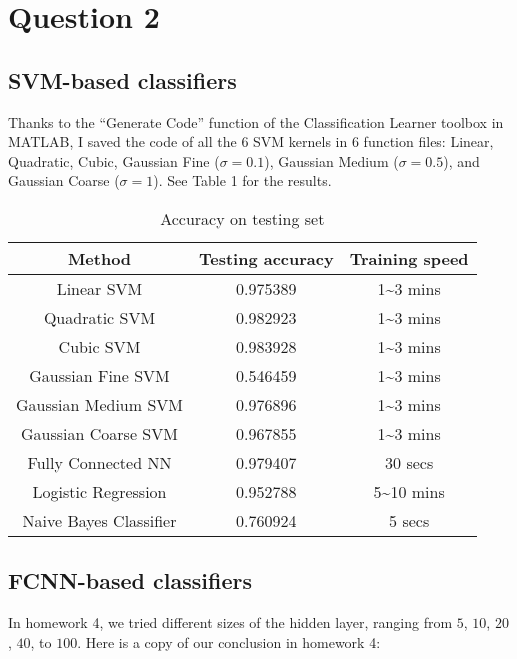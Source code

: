 \documentclass{article}
\begin{document}
\section*{Question 2}
{
    \subsection*{SVM-based classifiers}
    {
        Thanks to the ``Generate Code'' function of the Classification Learner toolbox in MATLAB, I saved the code of all the 6 SVM kernels in 6 function files: Linear, Quadratic, Cubic, Gaussian Fine ($\sigma=0.1$), Gaussian Medium ($\sigma=0.5$), and Gaussian Coarse ($\sigma=1$). See Table 1 for the results.

        \begin{table}[!hbp]
            \centering
            \begin{tabular}{|c|c|c|}
            \hline
            Method & Testing accuracy & Training speed \\
            \hline
            \hline
            Linear SVM & 0.975389 & 1\textasciitilde 3 mins\\
            \hline
            Quadratic SVM & 0.982923 & 1\textasciitilde 3 mins\\
            \hline
            Cubic SVM & 0.983928 & 1\textasciitilde 3 mins\\
            \hline
            Gaussian Fine SVM & 0.546459 & 1\textasciitilde 3 mins\\
            \hline
            Gaussian Medium SVM & 0.976896 & 1\textasciitilde 3 mins\\
            \hline
            Gaussian Coarse SVM & 0.967855 & 1\textasciitilde 3 mins\\
            \hline
            \hline
            Fully Connected NN & 0.979407 & 30 secs\\
            \hline
            Logistic Regression & 0.952788 & 5\textasciitilde 10 mins\\
            \hline
            \hline
            Naive Bayes Classifier & 0.760924 & 5 secs\\
            \hline
            \end{tabular}
            \caption{Accuracy on testing set}
        \end{table}
    }

    \subsection*{FCNN-based classifiers}
    {
        In homework 4, we tried different sizes of the hidden layer, ranging from $5$, $10$, $20$, $40$, to $100$. Here is a copy of our conclusion in homework 4:

}}
\end{document}
